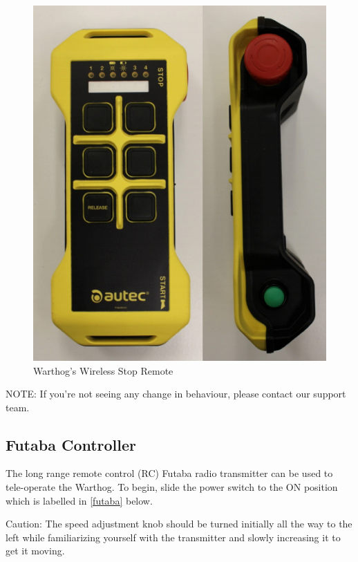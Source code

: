 \documentclass[]{clearpath-latex/clearpath-manual}
\begin{document}
\begin{figure}[!h]
  \centering
  \includegraphics[width=1.0\linewidth]{wireless-stop-remote.png}
  \caption{Warthog's Wireless Stop Remote}
  \label{wireless-stop}
\end{figure}


NOTE: If you’re not seeing any change in behaviour, please contact our support team.

\pagebreak[4]

\subsection{Futaba Controller}

The long range remote control (RC) Futaba radio transmitter can be used to tele-operate the Warthog.
To begin, slide the power switch to the ON position which is labelled in  
\autoref{futaba} below.

\begin{warning}[]
Caution: The speed adjustment knob should be turned initially all the way to the left while familiarizing yourself with the transmitter and slowly increasing it to get it moving.
\end{warning}
\end{document}
